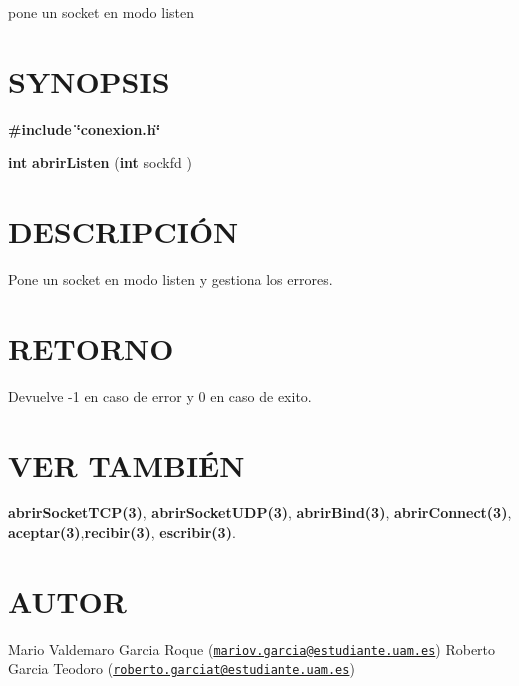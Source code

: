pone un socket en modo listen\hypertarget{cerrar_canal__s_s_l_SYNOPSIS}{}\section{S\-Y\-N\-O\-P\-S\-I\-S}\label{cerrar_canal__s_s_l_SYNOPSIS}
{\bfseries \#include} {\bfseries \char`\"{}conexion.\-h\char`\"{}} 

{\bfseries int} {\bfseries abrir\-Listen} {\bfseries }({\bfseries int} sockfd {\bfseries })\hypertarget{cerrar_canal__s_s_l_descripcion}{}\section{D\-E\-S\-C\-R\-I\-P\-C\-IÓ\-N}\label{cerrar_canal__s_s_l_descripcion}
Pone un socket en modo listen y gestiona los errores.\hypertarget{cerrar_canal__s_s_l_retorno}{}\section{R\-E\-T\-O\-R\-N\-O}\label{cerrar_canal__s_s_l_retorno}
Devuelve -\/1 en caso de error y 0 en caso de exito.\hypertarget{cerrar_canal__s_s_l_seealso}{}\section{V\-E\-R T\-A\-M\-B\-IÉ\-N}\label{cerrar_canal__s_s_l_seealso}
{\bfseries abrir\-Socket\-T\-C\-P(3)}, {\bfseries abrir\-Socket\-U\-D\-P(3)}, {\bfseries abrir\-Bind(3)}, {\bfseries abrir\-Connect(3)}, {\bfseries aceptar(3)},{\bfseries recibir(3)}, {\bfseries escribir(3)}.\hypertarget{cerrar_canal__s_s_l_authors}{}\section{A\-U\-T\-O\-R}\label{cerrar_canal__s_s_l_authors}
Mario Valdemaro Garcia Roque (\href{mailto:mariov.garcia@estudiante.uam.es}{\tt mariov.\-garcia@estudiante.\-uam.\-es}) Roberto Garcia Teodoro (\href{mailto:roberto.garciat@estudiante.uam.es}{\tt roberto.\-garciat@estudiante.\-uam.\-es}) 